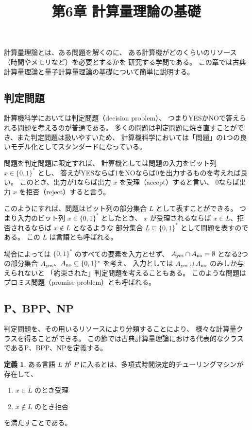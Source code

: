 \documentclass[a4paper, 10pt]{jsarticle}
\title{第6章 計算量理論の基礎}
\author{}
\theoremstyle{definition}
\theoremstyle{definition}
\newtheorem{dfn}{定義}
\begin{document}
\maketitle

\setcounter{section}{6}

計算量理論とは、ある問題を解くのに、
ある計算機がどのくらいのリソース（時間やメモリなど）を必要とするかを
研究する学問である。
この章では古典計算量理論と量子計算量理論の基礎について簡単に説明する。

\subsection{判定問題}
計算機科学においては判定問題（decision problem）、
つまりYESかNOで答えられる問題を考えるのが普通である。
多くの問題は判定問題に焼き直すことができ、また判定問題は扱いやすいため、
計算機科学においては「問題」の1つの良いモデル化としてスタンダードになっている。

問題を判定問題に限定すれば、
計算機としては問題の入力をビット列 $x \in \{0, 1\}^*$ とし、
答えがYESならば1をNOならば0を出力するものを考えれば良い。
このとき、出力が1ならば出力 $x$ を受理（accept）すると言い、
0ならば出力 $x$ を拒否（reject）すると言う。

このようにすれば、問題はビット列の部分集合 $L$ として表すことができる。
つまり入力のビット列 $x \in \{0, 1\}^*$ としたとき、
$x$ が受理されるならば $x \in L$、拒否されるならば $x \notin L$ となるような
部分集合 $L \subseteq \{0, 1\}^*$ として問題を表すのである。
この $L$ は言語とも呼ばれる。

場合によっては $\{0, 1\}^*$ のすべての要素を入力とせず、
$A_{\rm yes} \cap A_{\rm no} = \emptyset$ となる2つの部分集合
$A_{\rm yes}$、$A_{\rm no} \subseteq \{0, 1\}^*$ を考え、
入力としては $A_{\rm yes} \cup A_{\rm no}$ のみしか与えられないと
「約束された」判定問題を考えることもある。
このような問題はプロミス問題（promise problem）とも呼ばれる。

\subsection{P、BPP、NP}
判定問題を、その用いるリソースにより分類することにより、
様々な計算量クラスを得ることができる。
この節では古典計算量理論における代表的なクラスであるP、BPP、NPを定義する。

\begin{dfn}
	ある言語 $L$ が $P$ に入るとは、多項式時間決定的チューリングマシンが存在して、
	\begin{enumerate} \label{def:P}
		\item $x \in L$ のとき受理
		\item $x \notin L$ のとき拒否
	\end{enumerate}
	を満たすことである。
\end{dfn}
\end{document}
